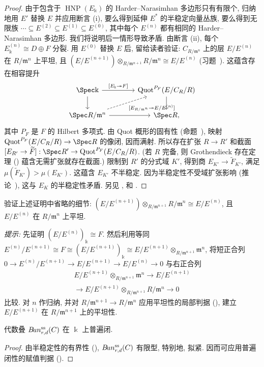 \begin{proof}
由于包含于 $\operatorname{HNP}(E_{\Bbbk})$ 的 Harder--Narasimhan 多边形只有有限个, 归纳地用 $E'$ 替换 $E$ 并应用断言 (i), 要么得到延伸 $E^*$ 的半稳定向量丛族, 要么得到无限族 $\cdots\subseteq E^{(2)}\subseteq E^{(1)}\subseteq E^{(0)}$, 其中每个 $E^{(n)}$ 都有相同的 Harder--Narasimhan 多边形. 我们将说明后一情形导致矛盾. 由断言 (ii), 每个 $E_{\Bbbk}^{(n)}\cong D\oplus F$ 分裂. 用 $E^{(0)}$ 替换 $E$ 后, 留给读者验证: $C_{R/\mathfrak m^n}$ 上的层 $E/E^{(n)}$ 在 $R/\mathfrak m^n$ 上平坦, 且 $(E/E^{(n+1)})\otimes_{R/\mathfrak m^{n+1}}R/\mathfrak m^n\cong E/E^{(n)}$ (习题~). 这蕴含存在相容提升
\[
\begin{tikzcd}[ampersand replacement=\&,column sep=large]
\Spec\Bbbk\arrow[r,"{[E_{\Bbbk}\twoheadrightarrow F]}"]\arrow[d]\&\Quot^{P_F}(E/C_R/R)\arrow[d]\\
\Spec R/\mathfrak m^n\arrow[r]\arrow[ur,dashed,"{[E_{R/\mathfrak m^n}\twoheadrightarrow E/E^{(n)}]}"']\&\Spec R,
\end{tikzcd}
\]
其中 $P_F$ 是 $F$ 的 Hilbert 多项式. 由 Quot 概形的固有性 (命题~), 映射 $\Quot^{P_F}(E/C_R/R)\to\Spec R$ 的像闭, 因而满射. 所以存在扩张 $R\to R'$ 和截面 $[E_{R'}\to\widetilde F]:\Spec R'\to\Quot^{P_F}(E/C_R/R)$. (若 $R$ 完备, 则 Grothendieck 存在定理 () 蕴含无需扩张就存在截面.) 限制到 $R'$ 的分式域 $K'$, 得到商 $E_{K'}\to\widetilde F_{K'}$, 满足 $\mu(\widetilde F_{K'})>\mu(E_{K'})$. 这蕴含 $E_{K'}$ 不半稳定. 因为半稳定性不受域扩张影响 (推论~), 这与 $E_K$ 的半稳定性矛盾. 另见 \cite{Lan75}, \cite[定理 2.B.1]{HL10} 和 \cite[定理 5.7]{Mar78}.
\end{proof}
\begin{exercise}\label{src:9.3.4}
验证上述证明中省略的细节: $(E/E^{(n+1)})\otimes_{R/\mathfrak m^{n+1}}R/\mathfrak m^n\cong E/E^{(n)}$, 且 $E/E^{(n)}$ 在 $R/\mathfrak m^n$ 上平坦.

\textit{提示:} 先证明 $(E/E^{(n)})_{\Bbbk}\cong F$. 然后利用等同 $E^{(n)}/E^{(n+1)}\cong F\cong(E/E^{(n+1)})_{\Bbbk}\cong E/E^{(n+1)}\otimes_{R/\mathfrak m^{n+1}}\mathfrak m^n$, 将短正合列 $0\to E^{(n)}/E^{(n+1)}\to E/E^{(n+1)}\to E/E^{(n)}\to0$ 与右正合列
\[
\begin{aligned}
E/E^{(n+1)}\otimes_{R/\mathfrak m^{n+1}}\mathfrak m^n\to E/E^{(n+1)}\\
\to E/E^{(n+1)}\otimes_{R/\mathfrak m^{n+1}}R/\mathfrak m^n\to0
\end{aligned}
\]
比较. 对 $n$ 作归纳, 并对 $R/\mathfrak m^{n+1}\to R/\mathfrak m^n$ 应用平坦性的局部判据 (), 建立 $E/E^{(n+1)}$ 在 $R/\mathfrak m^{n+1}$ 上的平坦性.
\end{exercise}
\begin{corollary}\label{src:9.3.5}
代数叠 $B\!un_{r,d}^{\mathrm{ss}}(C)$ 在 $\Bbbk$ 上普遍闭.
\end{corollary}
\begin{proof}
由半稳定性的有界性 (), $B\!un_{r,d}^{\mathrm{ss}}(C)$ 有限型, 特别地, 拟紧. 因而可应用普遍闭性的赋值判据 ().
\end{proof}
